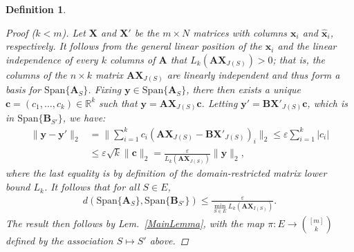 \documentclass[9pt,twocolumn]{pnas-new}
\newtheorem{definition}{Definition}
\begin{document}
\begin{definition}
\begin{proof}[Proof ($k < m$)]
Let $\mathbf{X}$ and $\mathbf{X}'$ be the $m \times N$ matrices with columns $\mathbf{x}_i$ and $\mathbf{\hat x}_i$, respectively. It follows from the general linear position of the $\mathbf{x}_i$ and the linear independence of every $k$ columns of $\mathbf{A}$ that $L_k(\mathbf{AX}_{J(S)}) > 0$; that is, the columns of the $n \times k$ matrix $\mathbf{AX}_{J(S)}$ are linearly independent and thus form a basis for $\text{Span}\{\mathbf{A}_{S}\}$. Fixing $\mathbf{y} \in \text{Span}\{\mathbf{A}_{S}\}$, there then exists a unique $\mathbf{c} = (c_1, \ldots, c_k) \in \mathbb{R}^k$ such that $\mathbf{y} = \mathbf{AX}_{J(S)}\mathbf{c}$. Letting \mbox{$\mathbf{y'} = \mathbf{BX}'_{J(S)}\mathbf{c}$}, which is in $\text{Span}\{\mathbf{B}_{S'}\}$, we have:
\begin{align*}
\|\mathbf{y} - \mathbf{y'}\|_2 
&= \|\sum_{i=1}^k c_i(\mathbf{AX}_{J(S)} - \mathbf{BX}'_{J(S)})_i\|_2
\leq \varepsilon \sum_{i=1}^k |c_i| \\
&\leq \varepsilon \sqrt{k}  \|\mathbf{c}\|_2 
= \frac{\varepsilon}{L_k(\mathbf{AX}_{J(S)})} \|\mathbf{y}\|_2,
\end{align*}
where the last equality is by definition of the domain-restricted matrix lower bound $L_k$. It follows that for all $S \in E$,
\begin{align}\label{rhs222}
d(\text{Span}\{\mathbf{A}_S\}, \text{Span}\{\mathbf{B}_{S'}\}) 
\leq \frac{\varepsilon}{ \min_{S \in E} L_k(\mathbf{AX}_{I(S)}) }.
\end{align}
The result then follows by  Lem.~\ref{MainLemma}, with the map $\pi: E \to {[m] \choose k}$ defined by the association $S \mapsto S'$ above.
\end{proof}

 

\end{definition}
\end{document}
